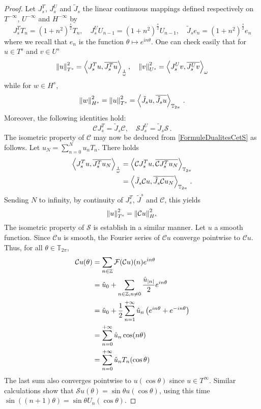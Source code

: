 \documentclass[a4paper]{article}
\begin{document}
\begin{proof}
	Let $J_s^T$, $J_s^U$ and $\tilde{J}_s$ the linear continuous mappings defined respectively on $T^{-\infty}$, $U^{-\infty}$ and $H^{-\infty}$ by
	\[J_s^TT_n = (1 + n^2)^\frac{s}{2} T_n, \quad J_s^UU_{n-1} = (1 + n^2)^{\frac{s}{2}} U_{n-1}, \quad \tilde{J}_s e_n = (1 + n^2)^\frac{s}{2} e_n\]
	where we recall that $e_n$ is the function $\theta \mapsto e^{in\theta}$. One can check easily that for $u \in T^s$ and $v \in U^s$
	\[\left\|u\right\|_{T^s}^2 = \left\langle J_s^Tu,\overline{J_s^T u}\right\rangle_\frac{1}{\omega}, \quad \left\|v\right\|_{U^s}^2 = \left\langle J_s^U v,\overline{J_s^U v}\right\rangle_\omega\]
	while for $w \in H^s$, 
	\[\left\|w\right\|_{H^s}^2 = \left\|u\right\|_{T^s}^2 = \left\langle \tilde{J}_su,\overline{\tilde{J}_s u}\right\rangle_{\mathbb{T}_{2\pi}}\,.\]
	Moreover, the following identities hold:
	\[\mathcal{C} J_s^T = \tilde{J}_s \mathcal{C}, \quad \mathcal{S} J_s^U = \tilde{J}_s \mathcal{S}\,.\]
	The isometric property of $\mathcal{C}$ may now be deduced from \autoref{FormuleDualitesCetS} as follows. Let $u_N = \sum_{n = 0}^N u_n T_n$. There holds 
	\[\begin{split}
	\left\langle J_s^T u,\overline{J_s^T u_N}\right\rangle_{\frac{1}{\omega}} &= \left\langle \mathcal{C} J_s^T u,\overline{\mathcal{C} J_s^T u_N}\right\rangle_{\mathbb{T}_{2\pi}}\\
	& = \left\langle \tilde{J}_s \mathcal{C} u,\overline{\tilde{J}_s \mathcal{C} u_N}\right\rangle_{\mathbb{T}_{2\pi}}\,.
	\end{split}\] 
	Sending $N$ to infinity, by continuity of $J_s^T$, $\tilde{J}^s$ and $\mathcal{C}$, this yields
	\[\left\|u\right\|_{T^s}^2 = \left\|\mathcal{C}u\right\|_{H^s}^2\]
	The isometric property of $\mathcal{S}$ is establish in a similar manner. Let $u$ a smooth function. Since $\mathcal{C}u$ is smooth, the Fourier series of $\mathcal{C}u$ converge pointwise to $\mathcal{C}u$. Thus, for all $\theta \in \mathbb{T}_{2\pi}$,
	\[\begin{split}
	\mathcal{C}u(\theta) &= \sum_{n \in \mathbb{Z}} \mathcal{F}(\mathcal{C}u)(n)e^{in\theta}\\
	&= \hat{u}_0 + \sum_{n \in \mathbb{Z}, n\neq 0} \frac{\hat{u}_{\left\lvert n \right\rvert}}{2} e^{in\theta}\\
	&= \hat{u}_0 + \frac{1}{2}\sum_{n = 1}^{+\infty} \hat{u}_n \left(e^{in\theta} + e^{-in\theta} \right)\\
	& = \sum_{n = 0}^{+ \infty} \hat{u}_n \cos(n \theta)\\
	& = \sum_{n = 0}^{+ \infty} \hat{u}_n T_n(\cos\theta)
	\end{split}\]
	The last sum also converges pointwise to $u(\cos\theta)$ since $u \in T^\infty$. Similar calculations show that $\mathcal{S}u(\theta) = \sin\theta u(\cos\theta)$, using this time $\sin((n+1)\theta) = \sin\theta U_n(\cos\theta)$. 

\end{proof}
\end{document}
